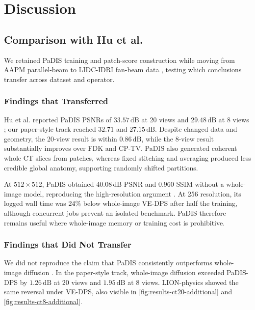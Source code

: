 \ifpdf
    \graphicspath{{Sections/5_discussion_figs/Raster/}{Sections/5_discussion_figs/PDF/}{Sections/5_discussion_figs/}}
\else
    \graphicspath{{Sections/5_discussion_figs/Vector/}{Sections/5_discussion_figs/}}
\fi

\chapter{Discussion}
\label{sec:discussion}

\section{Comparison with Hu et al.}

We retained PaDIS training and patch-score construction while moving from AAPM parallel-beam to LIDC-IDRI fan-beam data \cite{hu_learning_2024}, testing which conclusions transfer across dataset and operator.

\subsection{Findings that Transferred}

Hu et al. reported PaDIS PSNRs of \(33.57\,\mathrm{dB}\) at 20 views and \(29.48\,\mathrm{dB}\) at 8 views \cite{hu_learning_2024}; our paper-style track reached \(32.71\) and \(27.15\,\mathrm{dB}\). Despite changed data and geometry, the 20-view result is within \(0.86\,\mathrm{dB}\), while the 8-view result substantially improves over FDK and CP-TV. PaDIS also generated coherent whole CT slices from patches, whereas fixed stitching and averaging produced less credible global anatomy, supporting randomly shifted partitions.

At \(512\times512\), PaDIS obtained \(40.08\,\mathrm{dB}\) PSNR and \(0.960\) SSIM without a whole-image model, reproducing the high-resolution argument \cite{hu_learning_2024}. At 256 resolution, its logged wall time was \(24\%\) below whole-image VE-DPS after half the training, although concurrent jobs prevent an isolated benchmark. PaDIS therefore remains useful where whole-image memory or training cost is prohibitive.

\subsection{Findings that Did Not Transfer}

We did not reproduce the claim that PaDIS consistently outperforms whole-image diffusion \cite{hu_learning_2024}. In the paper-style track, whole-image diffusion exceeded PaDIS-DPS by \(1.26\,\mathrm{dB}\) at 20 views and \(1.95\,\mathrm{dB}\) at 8 views. LION-physics showed the same reversal under VE-DPS, also visible in \autoref{fig:results-ct20-additional} and \autoref{fig:results-ct8-additional}.

